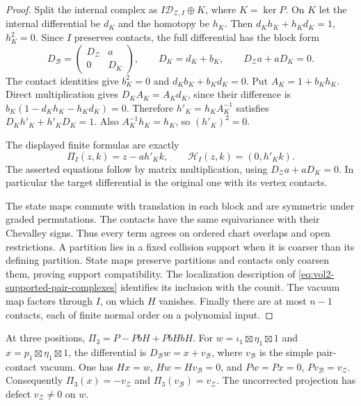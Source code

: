 \begin{proof}
Split the internal complex as $I\mathcal D_{\mathcal Z,I}
\oplus K$, where $K=\ker P$. On $K$ let the internal
differential be $d_K$ and the homotopy be $h_K$. Then
$d_Kh_K+h_Kd_K=1$, $h_K^2=0$. Since $I$ preserves contacts,
the full differential has the block form
\[
 D_{\mathcal B}=\begin{pmatrix}D_{\mathcal Z}&a\\0&D_K\end{pmatrix},
 \qquad D_K=d_K+b_K,\qquad D_{\mathcal Z}a+aD_K=0.
\]
The contact identities give $b_K^2=0$ and
$d_Kb_K+b_Kd_K=0$.
Put $A_K=1+b_Kh_K$. Direct multiplication gives
$D_KA_K=A_Kd_K$, since their difference is
$b_K(1-d_Kh_K-h_Kd_K)=0$.
Therefore $h'_K=h_KA_K^{-1}$ satisfies
$D_Kh'_K+h'_KD_K=1$.
Also $A_K^{-1}h_K=h_K$, so $(h'_K)^2=0$.

The displayed finite formulas are exactly
\[
 \Pi_I(z,k)=z-ah'_Kk,\qquad
 \mathcal H_I(z,k)=(0,h'_Kk).
\]
The asserted equations follow by matrix multiplication,
using $D_{\mathcal Z}a+aD_K=0$. In particular the target
differential is the original one with its vertex contacts.

The state maps commute with translation in each block and
are symmetric under graded permutations. The contacts have
the same equivariance with their Chevalley signs. Thus every
term agrees on ordered chart overlaps and open restrictions.
A partition lies in a fixed collision support when it is
coarser than its defining partition. State maps preserve
partitions and contacts only coarsen them, proving support
compatibility. The localization description of
\eqref{eq:vol2-supported-pair-complexes} identifies its
inclusion with the counit. The vacuum map factors through
$I$, on which $H$ vanishes. Finally there are at most $n-1$
contacts, each of finite normal order on a polynomial input.
\end{proof}

At three positions, $\Pi_3=P-PbH+PbHbH$.
For $w=\iota_1\boxtimes\eta_1\boxtimes1$ and
$x=p_1\boxtimes\eta_1\boxtimes1$, the differential is
$D_{\mathcal B}w=x+v_{\mathcal B}$, where
$v_{\mathcal B}$ is the simple pair-contact vacuum.
One has $Hx=w$, $Hw=Hv_{\mathcal B}=0$, and
$Pw=Px=0$, $Pv_{\mathcal B}=v_{\mathcal Z}$.
Consequently $\Pi_3(x)=-v_{\mathcal Z}$ and
$\Pi_3(v_{\mathcal B})=v_{\mathcal Z}$.
The uncorrected projection has defect $v_{\mathcal Z}\ne0$
on $w$.

